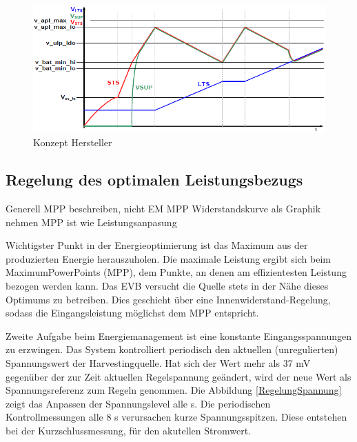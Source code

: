 \begin{figure}
   \includegraphics{2TheoretischeGrundlagen/imag/KonzeptFirma.png}
   \caption{Konzept Hersteller }\label{energiespeisung_lts} 
\end{figure}





\subsection{Regelung des optimalen Leistungsbezugs}

Generell MPP beschreiben, nicht EM MPP
Widerstandskurve als Graphik nehmen
MPP ist wie Leistungsanpasung

Wichtigster Punkt in der Energieoptimierung ist das Maximum aus der produzierten Energie herauszuholen. Die maximale Leistung ergibt sich beim MaximumPowerPoints (MPP), dem Punkte, an denen am effizientesten Leistung bezogen werden kann. 
Das EVB versucht die Quelle stets in der Nähe dieses Optimums zu betreiben. Dies geschieht über eine Innenwiderstand-Regelung, sodass die Eingangsleistung möglichst dem MPP entspricht.

Zweite Aufgabe beim Energiemanagement ist eine konstante Eingangsspannungen zu erzwingen. Das System kontrolliert periodisch den aktuellen (unregulierten) Spannungswert der Harvestingquelle. Hat sich der Wert mehr als 37 mV gegenüber der zur Zeit aktuellen Regelspannung geändert, wird der neue Wert als Spannungsreferenz zum Regeln genommen. Die Abbildung \ref{RegelungSpannung} zeigt das Anpassen der Spannungslevel alle s. Die periodischen Kontrollmessungen alle 8 s verursachen kurze Spannungsspitzen. Diese entstehen bei der Kurzschlussmessung, für den akutellen Stromwert.


